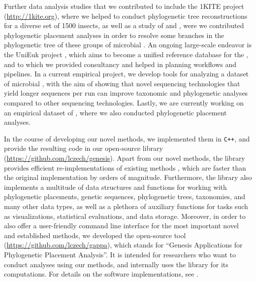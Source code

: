Further data analysis studies that we contributed to include the 1KITE project \cite{Misof2014} (\url{http://1kite.org}),
where we helped to conduct phylogenetic tree reconstructions for a diverse set of \num{1500} insects,
as well as a study of  and  \cite{Bass2018a},
were we contributed phylogenetic placement analyses
in order to resolve some branches in the phylogenetic tree of these groups of microbial .
An ongoing large-scale endeavor is the UniEuk project \cite{Berney2017},
which aims to become a unified reference database for the ,
and to which we provided consultancy and helped in planning workflows and pipelines.
In a current empirical project, we develop tools for analyzing a dataset of microbial ,
with the aim of showing that novel sequencing technologies that yield longer sequences per run
can improve taxonomic and phylogenetic analyses compared to other sequencing technologies.
Lastly, we are currently working on an empirical dataset of ,
where we also conducted phylogenetic placement analyses.

In the course of developing our novel methods, we implemented them in \texttt{C++},
and provide the resulting code in our open-source library  (\url{https://github.com/lczech/genesis}).
Apart from our novel methods, the library provides efficient re-implementations of existing methods \cite{Matsen2010},
which are faster than the original implementation by orders of magnitude.
Furthermore, the library also implements a multitude of data structures and functions for working with
phylogenetic placements, genetic sequences, phylogenetic trees, taxonomies, and many other data types,
as well as a plethora of auxiliary functions for tasks such as visualizations, statistical evaluations, and data storage.
Moreover, in order to also offer a user-friendly command line interface for the most important novel and established methods,
we developed the open-source tool  (\url{https://github.com/lczech/gappa}),
which stands for ``Genesis Applications for Phylogenetic Placement Analysis''.
It is intended for researchers who want to conduct analyses using our methods,
and internally uses the  library for its computations.
For details on the software implementations, see .


